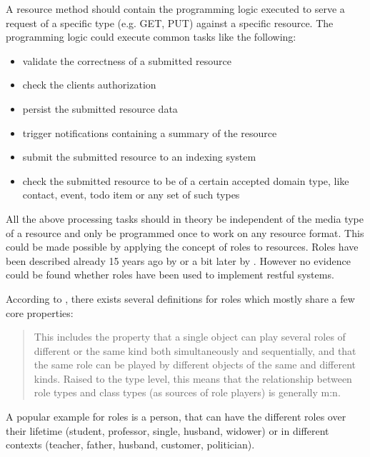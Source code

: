 \documentclass[12pt,a4paper,twoside]{scrartcl}		%
\begin{document}
A resource method should contain the programming logic executed to serve a
request of a specific type (e.g. GET, PUT) against a specific resource. The
programming logic could execute common tasks like the following:

\begin{itemize}
\item validate the correctness of a submitted resource
\item check the clients authorization
\item persist the submitted resource data
\item trigger notifications containing a summary of the resource
\item submit the submitted resource to an indexing system
\item check the submitted resource to be of a certain accepted domain type, like
  contact, event, todo item or any set of such types
\end{itemize}

All the above processing tasks should in theory be independent of the media type
of a resource and only be programmed once to work on any resource format. This
could be made possible by applying the concept of roles to resources. Roles have
been described already 15 years ago by \cite{Fowler1997} or a bit later by
\cite{Baeumer2000}. However no evidence could be found whether roles have been
used to implement restful systems.

According to \cite{Steimann2008}, there exists several definitions for roles
which mostly share a few core properties:

\begin{quote}
  This includes the property that a single object can play several roles of
  different or the same kind both simultaneously and sequentially, and that the
  same role can be played by different objects of the same and different
  kinds. Raised to the type level, this means that the relationship between role
  types and class types (as sources of role players) is generally m:n.
\end{quote}

A popular example for roles is a person, that can have the different roles over
their lifetime (student, professor, single, husband, widower) or in different
contexts (teacher, father, husband, customer, politician).

\end{document}
